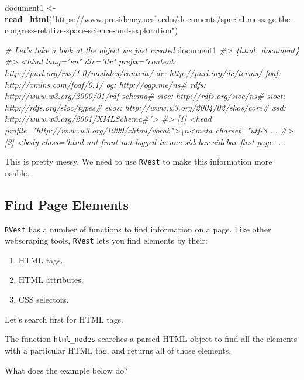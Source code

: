 \documentclass[]{book}
\newenvironment{Shaded}{\begin{snugshade}}{\end{snugshade}}
\newcommand{\KeywordTok}[1]{\textcolor[rgb]{0.13,0.29,0.53}{\textbf{#1}}}
\newcommand{\StringTok}[1]{\textcolor[rgb]{0.31,0.60,0.02}{#1}}
\newcommand{\CommentTok}[1]{\textcolor[rgb]{0.56,0.35,0.01}{\textit{#1}}}
\newcommand{\NormalTok}[1]{#1}
\providecommand{\tightlist}{%
  \setlength{\itemsep}{0pt}\setlength{\parskip}{0pt}}
\begin{document}
\begin{Shaded}
\begin{Highlighting}[]
\NormalTok{document1 <-}\StringTok{ }\KeywordTok{read_html}\NormalTok{(}\StringTok{"https://www.presidency.ucsb.edu/documents/special-message-the-congress-relative-space-science-and-exploration"}\NormalTok{)}

\CommentTok{# Let's take a look at the object we just created}
\NormalTok{document1}
\CommentTok{#> \{html_document\}}
\CommentTok{#> <html lang="en" dir="ltr" prefix="content: http://purl.org/rss/1.0/modules/content/ dc: http://purl.org/dc/terms/ foaf: http://xmlns.com/foaf/0.1/ og: http://ogp.me/ns# rdfs: http://www.w3.org/2000/01/rdf-schema# sioc: http://rdfs.org/sioc/ns# sioct: http://rdfs.org/sioc/types# skos: http://www.w3.org/2004/02/skos/core# xsd: http://www.w3.org/2001/XMLSchema#">}
\CommentTok{#> [1] <head profile="http://www.w3.org/1999/xhtml/vocab">\textbackslash{}n<meta charset="utf-8 ...}
\CommentTok{#> [2] <body class="html not-front not-logged-in one-sidebar sidebar-first page- ...}
\end{Highlighting}
\end{Shaded}

This is pretty messy. We need to use \texttt{RVest} to make this
information more usable.

\subsection{Find Page Elements}\label{find-page-elements}

\texttt{RVest} has a number of functions to find information on a page.
Like other webscraping tools, \texttt{RVest} lets you find elements by
their:

\begin{enumerate}
\def\labelenumi{\arabic{enumi}.}
\tightlist
\item
  HTML tags.
\item
  HTML attributes.
\item
  CSS selectors.
\end{enumerate}

Let's search first for HTML tags.

The function \texttt{html\_nodes} searches a parsed HTML object to find
all the elements with a particular HTML tag, and returns all of those
elements.

What does the example below do?
\end{document}
